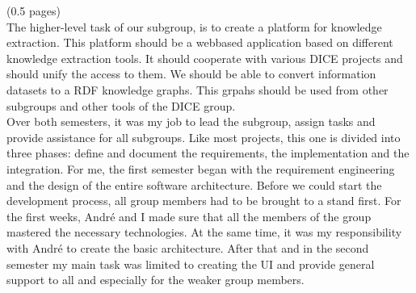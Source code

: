 (0.5 pages)\\

The higher-level task of our subgroup, is to create a platform for knowledge extraction. This platform should be a webbased application based on different knowledge extraction tools. It should cooperate with various DICE projects and should unify the access to them. We should be able to convert information datasets to a RDF knowledge graphs. This grpahs should be used from other subgroups and other tools of the DICE group.\\

Over both semesters, it was my job to lead the subgroup, assign tasks and provide assistance for all subgroups. Like most projects, this one is divided into three phases: define and document the requirements, the implementation and the integration. For me, the first semester began with the requirement engineering and the design of the entire software architecture. Before we could start the development process, all group members had to be brought to a stand first. For the first weeks, André and I made sure that all the members of the group mastered the necessary technologies. At the same time, it was my responsibility with André to create the basic architecture. After that and in the second semester my main task was limited to creating the UI and provide general support to all and especially for the weaker group members.